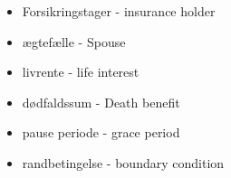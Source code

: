 \begin{itemize}
	\item Forsikringstager - insurance holder
	\item ægtefælle - Spouse
	\item livrente - life interest
	\item dødfaldssum - Death benefit
	\item pause periode - grace period
	\item randbetingelse - boundary condition
\end{itemize}